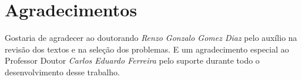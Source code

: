 \documentclass[
11pt, %
brazilian, %
singlespacing, %
]{MastersDoctoralThesis} %
\begin{document}



\chapter*{Agradecimentos}
\thispagestyle{empty}
Gostaria de agradecer ao doutorando \textit{Renzo Gonzalo Gomez Diaz} pelo auxílio na revisão dos textos e na seleção dos problemas.
E um agradecimento especial ao Professor Doutor \textit{Carlos Eduardo Ferreira} pelo suporte durante todo o desenvolvimento desse trabalho.

\clearpage




\tableofcontents %

\listoffigures %

\listoftables %


\end{document}
